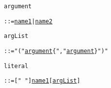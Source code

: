 
\begin{alltt}
\hypertarget{argumentP\newLinkVer}{argument} ::= \hyperlink{name1P\linkVer}{name1} | \hyperlink{name2P\linkVer}{name2} 
\end{alltt}

\begin{alltt}
\hypertarget{argListP\newLinkVer}{argList} ::= "(" \hyperlink{argumentP\linkVer}{argument} \verb"{""," \hyperlink{argumentP\linkVer}{argument}\verb"}" ")"
\end{alltt}

\begin{alltt}
\hypertarget{literalP\newLinkVer}{literal} ::= ["~"] \hyperlink{name1P\linkVer}{name1} [\hyperlink{argListP\linkVer}{argList}]
\end{alltt}

